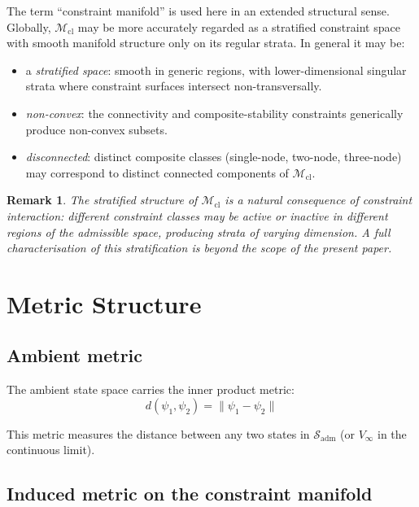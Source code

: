 \documentclass[12pt]{article}
\newtheorem{remark}[theorem]{Remark}
\newcommand{\Mcl}{\mathcal{M}_{\mathrm{cl}}}
\newcommand{\Sadm}{\mathcal{S}_{\mathrm{adm}}}
\begin{document}
The term ``constraint manifold'' is used here in an extended structural sense. Globally, $\Mcl$ may be more accurately regarded as a stratified constraint space with smooth manifold structure only on its regular strata. In general it may be:
\begin{itemize}
    \item a \textit{stratified space}: smooth in generic regions, with lower-dimensional singular strata where constraint surfaces intersect non-transversally.
    \item \textit{non-convex}: the connectivity and composite-stability constraints generically produce non-convex subsets.
    \item \textit{disconnected}: distinct composite classes (single-node, two-node, three-node) may correspond to distinct connected components of $\Mcl$.
\end{itemize}

\begin{remark}
The stratified structure of $\Mcl$ is a natural consequence of constraint interaction: different constraint classes may be active or inactive in different regions of the admissible space, producing strata of varying dimension. A full characterisation of this stratification is beyond the scope of the present paper.
\end{remark}

\section{Metric Structure}\label{sec:metric}

\subsection{Ambient metric}

The ambient state space carries the inner product metric:
\begin{equation}
    d(\psi_1, \psi_2) = \|\psi_1 - \psi_2\|
\end{equation}

This metric measures the distance between any two states in $\Sadm$ (or $V_\infty$ in the continuous limit).

\subsection{Induced metric on the constraint manifold}
\end{document}
